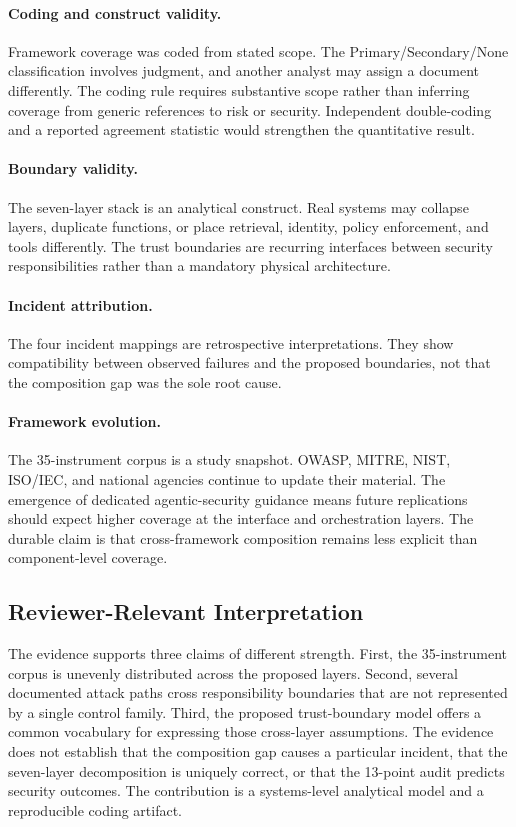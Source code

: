 \documentclass[runningheads]{llncs}
\begin{document}
\paragraph{Coding and construct validity.}
Framework coverage was coded from stated scope. The Primary/Secondary/None classification involves judgment, and another analyst may assign a document differently. The coding rule requires substantive scope rather than inferring coverage from generic references to risk or security. Independent double-coding and a reported agreement statistic would strengthen the quantitative result.

\paragraph{Boundary validity.}
The seven-layer stack is an analytical construct. Real systems may collapse layers, duplicate functions, or place retrieval, identity, policy enforcement, and tools differently. The trust boundaries are recurring interfaces between security responsibilities rather than a mandatory physical architecture.

\paragraph{Incident attribution.}
The four incident mappings are retrospective interpretations. They show compatibility between observed failures and the proposed boundaries, not that the composition gap was the sole root cause.

\paragraph{Framework evolution.}
The 35-instrument corpus is a study snapshot. OWASP, MITRE, NIST, ISO/IEC, and national agencies continue to update their material. The emergence of dedicated agentic-security guidance means future replications should expect higher coverage at the interface and orchestration layers. The durable claim is that cross-framework composition remains less explicit than component-level coverage.

\subsection{Reviewer-Relevant Interpretation}
\label{sec:reviewer}

The evidence supports three claims of different strength. First, the 35-instrument corpus is unevenly distributed across the proposed layers. Second, several documented attack paths cross responsibility boundaries that are not represented by a single control family. Third, the proposed trust-boundary model offers a common vocabulary for expressing those cross-layer assumptions. The evidence does not establish that the composition gap causes a particular incident, that the seven-layer decomposition is uniquely correct, or that the 13-point audit predicts security outcomes. The contribution is a systems-level analytical model and a reproducible coding artifact.
\end{document}
